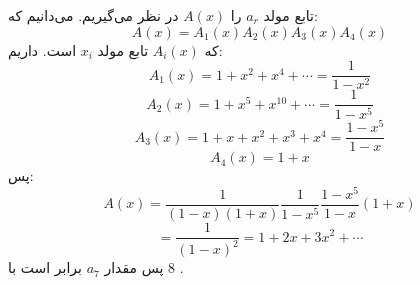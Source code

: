         \p
تابع مولد
$a_r$
را
$A(x)$
در نظر می‌گیریم. می‌دانیم که:
$$A(x) = A_1(x)A_2(x)A_3(x)A_4(x)$$
که
$A_i(x)$
تابع مولد
$x_i$
است. داریم:
$$A_1(x) = 1 + x^2 + x^4 + \cdots = \frac{1}{1-x^2}$$
$$A_2(x) = 1 + x^5 + x^{10} + \cdots = \frac{1}{1-x^5}$$
$$A_3(x) = 1 + x + x^2 + x^3 + x^4 = \frac{1-x^5}{1-x}$$
$$A_4(x) = 1 + x$$
پس:
$$A(x) = \frac{1}{(1-x)(1+x)}\frac{1}{1-x^5}\frac{1-x^5}{1-x}(1+x)$$
$$= \frac{1}{(1-x)^2} = 1 + 2x + 3x^2 + \cdots$$
پس مقدار
$a_7$
برابر است با
$8$
.